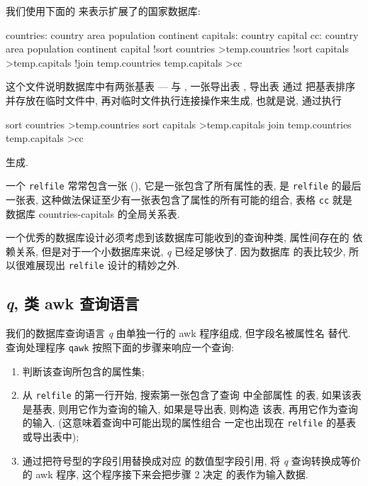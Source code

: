 我们使用下面的  来表示扩展了的国家数据库:
\begin{awkcode}
    countries:
        country
        area
        population
        continent
    capitals:
        country
        capital
    cc:
        country
        area
        population
        continent
        capital
        !sort countries >temp.countries
        !sort capitals >temp.capitals
        !join temp.countries temp.capitals >cc
\end{awkcode}
这个文件说明数据库中有两张基表 ---  与
, 一张导出表 , 导出表  通过 
把基表排序并存放在临时文件中, 再对临时文件执行连接操作来生成, 也就是说, 
 通过执行
\begin{awkcode}
    sort countries >temp.countries
    sort capitals >temp.capitals
    join temp.countries temp.capitals >cc
\end{awkcode}
生成.

一个 \texttt{relfile} 常常包含一张  (), 它是一张包含了所有属性的表, 是 \texttt{relfile} 的最后一张表,
这种做法保证至少有一张表包含了属性的所有可能的组合, 表格 \texttt{cc}
就是 数据库 countries-capitals 的全局关系表.

一个优秀的数据库设计必须考虑到该数据库可能收到的查询种类, 属性间存在的
依赖关系, 但是对于一个小数据库来说, \textit{q} 已经足够快了. 因为数据库
的表比较少, 所以很难展现出 \texttt{relfile} 设计的精妙之外.

\subsection{\textit{q}, 类 awk 查询语言}
\label{subsec:q_an_awk_like_query_language}

我们的数据库查询语言 \textit{q} 由单独一行的 awk 程序组成, 但字段名被属性名
替代. 查询处理程序 \texttt{qawk} 按照下面的步骤来响应一个查询:
\begin{enumerate}
	\item 判断该查询所包含的属性集;
	\item 从 \texttt{relfile} 的第一行开始, 搜索第一张包含了查询
	中全部属性
	的表, 如果该表是基表, 则用它作为查询的输入, 如果是导出表, 则构造
	该表, 再用它作为查询的输入. (这意味着查询中可能出现的属性组合
	一定也出现在 \texttt{relfile} 的基表或导出表中);
	\item 通过把符号型的字段引用替换成对应 的数值型字段引用, 将
	\textit{q} 查询转换成等价的 awk 程序, 这个程序接下来会把步骤 2 决定
	的表作为输入数据.
\end{enumerate}

